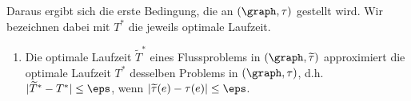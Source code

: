 Daraus ergibt sich die erste Bedingung, die an $(\graph, \tau)$ gestellt wird. Wir
bezeichnen dabei mit $T^*$ die jeweils optimale Laufzeit.
\begin{framed}
\begin{enumerate}[label={(A\arabic*)}]
    \item Die optimale Laufzeit $\widetilde{T}^*$ eines Flussproblems in
        $(\graph, \widetilde{\tau})$ approximiert die optimale Laufzeit $T^*$
        desselben Problems in $(\graph, \tau)$,
        d.h. $|\widetilde{T}^* - T^*| \leq \eps$,
        wenn $|\widetilde{\tau}(e) - \tau(e)| \leq \eps$. \label{a1}
\end{enumerate}
\end{framed}

